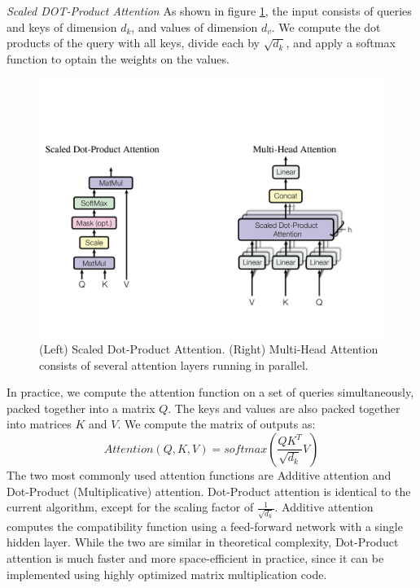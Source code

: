 \documentclass{report}
\begin{document}
\textit{Scaled DOT-Product Attention}
As shown in figure \ref{fig:scaled-dot-product-attention}, the input consists of queries and keys of dimension $d_k$, and values of dimension $d_v$. We compute the dot products of the query with all keys, divide each by $\sqrt{d_k}$, and apply a softmax function to optain the weights on the values.
\begin{figure}
	\includegraphics{images/transformer/scaled-dot-product-attention.PNG}
	\caption{(Left) Scaled Dot-Product Attention. (Right) Multi-Head Attention consists of several attention layers running in parallel.}
	\label{fig:scaled-dot-product-attention}
\end{figure}
In practice, we compute the attention function on a set of queries simultaneously, packed together into a matrix $Q$. The keys and values are also packed together into matrices $K$ and $V$. We compute the matrix of outputs as:
\begin{equation}
	Attention(Q, K, V) = softmax(\frac{Q K^T}{\sqrt{d_k}}V) %
	\label{eq:transformer-attention}
\end{equation}
The two most commonly used attention functions are Additive attention and Dot-Product (Multiplicative) attention. Dot-Product attention is identical to the current algorithm, except for the scaling factor of $\frac{1}{\sqrt{d_k}}$. Additive attention computes the compatibility function using a feed-forward network with a single hidden layer. While the two are similar in theoretical complexity, Dot-Product attention is much faster and more space-efficient in practice, since it can be implemented using highly optimized matrix multiplication code.
\end{document}
